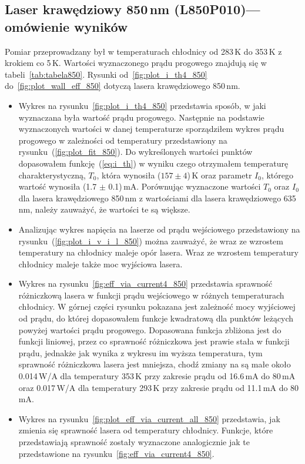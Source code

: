 \subsection{Laser krawędziowy 850\,nm (L850P010)--- omówienie wyników}
Pomiar przeprowadzany był w temperaturach chłodnicy od 283\,K do 353\,K z krokiem co 5\,K. Wartości wyznaczonego prądu progowego
znajdują się w tabeli~\ref{tab:tabela850}. Rysunki od~\ref{fig:plot_i_th4_850} do~\ref{fig:plot_wall_eff_850} dotyczą lasera
krawędziowego 850\,nm.
\begin{itemize}
\item Wykres na rysunku~\ref{fig:plot_i_th4_850} przedstawia sposób, w jaki wyznaczana była wartość prądu progowego. Następnie na podstawie
wyznaczonych wartości w danej temperaturze sporządziłem wykres prądu progowego w zależności od temperatury
przedstawiony na rysunku~(\ref{fig:plot_fit_850}). Do wykreślonych wartości punktów dopasowałem funkcję~(\ref{eq:i_th}) w wyniku czego otrzymałem
temperaturę charakterystyczną, $T_0$, która wynosiła ($157 \pm 4$)\,K oraz parametr $I_0$, którego wartość wynosiła (1.7 $\pm$ 0.1)\,mA.
Porównując wyznaczone wartości $T_0$ oraz $I_0$ dla lasera krawędziowego 850\,nm z wartościami dla lasera krawędziowego 635\,nm, należy
zauważyć, że wartości te są większe.
\item Analizując wykres napięcia na laserze od prądu wejściowego przedstawiony na rysunku~(\ref{fig:plot_i_v_i_l_850})
można zauważyć, że wraz ze wzrostem temperatury na chłodnicy
maleje opór lasera. Wraz ze wzrostem temperatury chłodnicy maleje także moc wyjściowa lasera.
\item Wykres na rysunku~\ref{fig:eff_via_current4_850} przedstawia sprawność różniczkową lasera w funkcji prądu wejściowego
w różnych temperaturach chłodnicy. W górnej części rysunku pokazana jest zależność mocy wyjściowej od prądu, do której dopasowałem
funkcje kwadratową dla punktów leżących powyżej wartości prądu progowego. Dopasowana funkcja zbliżona jest do funkcji liniowej, przez co sprawność różniczkowa jest
prawie stała w funkcji prądu, jednakże jak wynika z wykresu im wyższa temperatura, tym sprawność różniczkowa lasera jest mniejsza, chodź zmiany na
są małe około 0.014\,W/A dla temperatury 353\,K przy zakresie prądu od 16.6\,mA do 80\,mA oraz 0.017\,W/A dla temperatury 293\,K
przy zakresie prądu od 11.1\,mA do 80\,mA.
\item Wykres na rysunku~\ref{fig:plot_eff_via_current_all_850} przedstawia, jak zmienia się sprawność lasera od temperatury chłodnicy.
Funkcje, które przedstawiają sprawność zostały wyznaczone analogicznie jak te przedstawione na rysunku~\ref{fig:eff_via_current4_850}.

\end{itemize}
